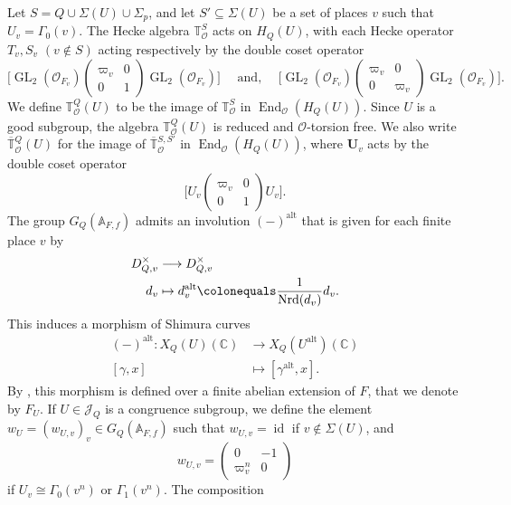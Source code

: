 \documentclass[a4paper, notitlepage, 10pt]{amsart}
\theoremstyle{plain} %
\theoremstyle{definition} %
\theoremstyle{remark} %
\numberwithin{equation}{section}
\newcommand{\bbA}{\mathbb A}
\newcommand{\bbC}{\mathbb C}
\newcommand{\bbT}{\mathbb T}
\newcommand{\GL}{\operatorname{GL}} %
\newcommand{\End}{\operatorname{End}} %
\newcommand{\id}{\operatorname{id}} %
\newcommand{\Nrd}{\operatorname{Nrd}}
\newcommand{\alt}{\operatorname{alt}}
\begin{document}
Let $S=Q\cup \Sigma(U)\cup \Sigma_p$, and let $S'\subseteq\Sigma(U)$ be a set of places $v$ such that $U_v=\Gamma_0(v)$. The Hecke algebra $\mathbb{T}^{S}_{\mathcal{O}}$ acts on $H_Q(U)$, with each Hecke operator $T_v,S_v$ $(v\not\in S)$ acting respectively by the double coset operator
$$ \Big[ \GL_2(\mathcal{O}_{F_v}) \begin{pmatrix} \varpi_v & 0 \\ 0 & 1 \end{pmatrix} \GL_2(\mathcal{O}_{F_v})\Big]  \quad \text{ and, } \quad \Big[ \GL_2(\mathcal{O}_{F_v}) \begin{pmatrix} \varpi_v & 0 \\ 0 & \varpi_v \end{pmatrix} \GL_2(\mathcal{O}_{F_v}) \Big].$$
We define $\bbT^Q_{\mathcal{O}}(U)$ to be the image of $\mathbb{T}^{S}_{\mathcal{O}}$ in $\End_{\mathcal{O}}(H_Q(U))$. Since $U$ is a good subgroup, the algebra $\mathbb{T}^Q_{\mathcal{O}}(U)$ is reduced and $\mathcal{O}$-torsion free. We also write $\overline{\bbT}{}^Q_{\mathcal{O}}(U)$ for the image of $\overline{\bbT}{}^{S,S'}_{\mathcal{O}}$ in $\End_{\mathcal{O}}(H_Q(U))$, where $\mathbf{U}_v$ acts by the double coset operator
$$\Big[ U_v \begin{pmatrix} \varpi_v & 0 \\ 0 & 1 \end{pmatrix} U_v\Big].  $$
The group $G_Q(\bbA_{F,f})$ admits an involution $(-)^{\alt}$ that is given for each finite place $v$ by
\begin{align*}
    D_{Q,v}^\times &\longrightarrow D_{Q,v}^\times
    \\ d_v &\mapsto d_v^{\alt} \colonequals \frac{1}{\Nrd(d_v)}d_v.
\end{align*}
This induces a morphism of Shimura curves 
\begin{align*}
    (-)^{\alt} \colon X_Q(U)(\bbC)& \longrightarrow X_Q(U^{\alt})(\bbC)
    \\ [\gamma, x] &\mapsto[\gamma^{\alt},x].
\end{align*}
By \cite[Lemma 2.2]{Fouquet}, this morphism is defined over a finite abelian extension of $F$, that we denote by $F_U$. If $U\in \mathcal{J}_Q$ is a congruence subgroup, we define the element $w_U=(w_{U,v})_v\in G_Q(\mathbb{A}_{F,f})$ such that $w_{U,v}=\id$ if $v\not\in \Sigma(U)$, and
$$ w_{U,v}=\begin{pmatrix}
    0 & -1 \\ \varpi_v^{n} & 0
\end{pmatrix} $$
if $U_v\cong \Gamma_0(v^n)$ or $ \Gamma_1(v^n)$. The composition 
\end{document}
